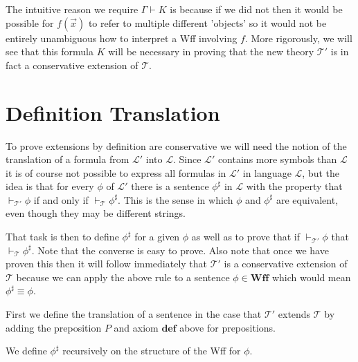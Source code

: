 \documentclass[12pt]{article}
\newcommand{\bv}[1]{\boldsymbol{#1}}
\newcommand{\mc}[1]{\mathcal{#1}}
\newcommand{\bc}[1]{\bv{\mc{#1}}}
\begin{document}
The intuitive reason we require $\Gamma \vdash K$ is because if we did not then it would be possible for $f(\vec{x})$ to refer to multiple different 'objects' so it would not be entirely unambiguous how to interpret a Wff involving $f$. More rigorously, we will see that this formula $K$ will be necessary in proving that the new theory $\bc{T}'$ is in fact a conservative extension of $\bc{T}$.

\section{Definition Translation}

To prove extensions by definition are conservative we will need the notion of the translation of a formula from $\bv{\mc{L}}'$ into $\bv{\mc{L}}$. Since $\bv{\mc{L}}'$ contains more symbols than $\bv{\mc{L}}$ it is of course not possible to express all formulas in $\bv{\mc{L}}'$ in language $\bv{\mc{L}}$, but the idea is that for every $\phi$ of $\bv{\mc{L}}'$ there is a sentence $\phi^\sharp$ in $\bv{\mc{L}}$ with the property that $\vdash_{\bc{T}'}\phi$ if and only if $\vdash_{\bc{T}}\phi^{\sharp}$. This is the sense in which $\phi$ and $\phi^{\sharp}$ are equivalent, even though they may be different strings.

That task is then to define $\phi^{\sharp}$ for a given $\phi$ as well as to prove that if $\vdash_{\bc{T}'}\phi$ that $\vdash_{\bc{T}}\phi^{\sharp}$. Note that the converse is easy to prove. Also note that once we have proven this then it will follow immediately that $\bc{T}'$ is a conservative extension of $\bc{T}$ because we can apply the above rule to a sentence $\phi \in \textbf{Wff}$ which would mean $\phi^{\sharp} \equiv \phi$.

First we define the translation of a sentence in the case that $\bc{T}'$ extends $\bc{T}$ by adding the preposition $P$ and axiom $\textbf{def}$ above for prepositions.

We define $\phi^{\sharp}$ recursively on the structure of the Wff for $\phi$. 
\end{document}

